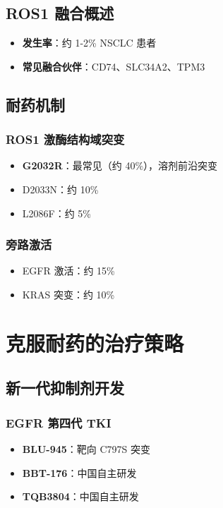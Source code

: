 \documentclass[12pt,a4paper]{article}
\begin{document}
\subsection{ROS1 融合概述}

\begin{itemize}
    \item \textbf{发生率}：约 1-2\% NSCLC 患者
    \item \textbf{常见融合伙伴}：CD74、SLC34A2、TPM3
\end{itemize}

\subsection{耐药机制}

\subsubsection{ROS1 激酶结构域突变}
\begin{itemize}
    \item \textbf{G2032R}：最常见（约 40\%），溶剂前沿突变
    \item D2033N：约 10\%
    \item L2086F：约 5\%
\end{itemize}

\subsubsection{旁路激活}
\begin{itemize}
    \item EGFR 激活：约 15\%
    \item KRAS 突变：约 10\%
\end{itemize}

\section{克服耐药的治疗策略}

\subsection{新一代抑制剂开发}

\subsubsection{EGFR 第四代 TKI}
\begin{itemize}
    \item \textbf{BLU-945}：靶向 C797S 突变
    \item \textbf{BBT-176}：中国自主研发
    \item \textbf{TQB3804}：中国自主研发
\end{itemize}
\end{document}

